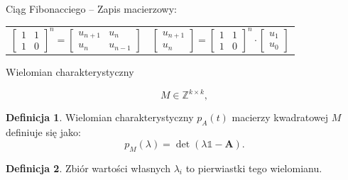 \documentclass[handout]{beamer}
\theoremstyle{definition}
\newtheorem*{definicja}{Definicja}
\theoremstyle{named}
\begin{document}
\begin{frame}{Ciąg Fibonacciego -- Zapis macierzowy:}
\begin{table}[]
\begin{tabular}{c|c}
\begin{equation*}
        \begin{bmatrix}
        1 & 1\\
        1 & 0
        \end{bmatrix}^n
        = 
        \begin{bmatrix}
        u_{n+1} & u_n\\
        u_{n} & u_{n-1}
        \end{bmatrix}

    \end{equation*}
&  \pause
       \begin{equation*}
        \begin{bmatrix}
        u_{n+1} \\
        u_{n}
        \end{bmatrix}
        = 
        \begin{bmatrix}
        1 & 1\\
        1 & 0
        \end{bmatrix}^n
        \cdot
        \begin{bmatrix}
        u_1 \\
        u_0 
        \end{bmatrix}

    \end{equation*}

    \end{tabular}
\end{table}


\end{frame}

\begin{frame}{Wielomian charakterystyczny}

\begin{equation}
    {\displaystyle M\in \mathbb {Z}^{k \times k},}
\end{equation}
\pause
\begin{definicja}
Wielomian charakterystyczny $p_{A}(t)$ macierzy kwadratowej $M$ definiuje się jako:
\begin{equation}
        {\displaystyle p_{M}(\lambda)=\det(\lambda  \mathbb{1} -\mathbf {A} ).}
\end{equation}
\end{definicja}
\pause
\begin{definicja}
    Zbiór wartości własnych $\lambda_{i}$ to pierwiastki tego wielomianu. 
\end{definicja}


\end{frame}
\end{document}
